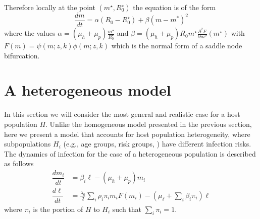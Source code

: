 \documentclass[12pt,a4paper]{article}
\theoremstyle{plain}%
\theoremstyle{definition}
\theoremstyle{remark}
\begin{document}
Therefore locally at the point $(m^{\star},R_0^{\star})$ the equation is of the form
\begin{equation}
\dfrac{dm}{dt}=\alpha (R_0-R_0^{\star})+\beta (m-m^*)^2
\end{equation}
where the values $\alpha=(\mu_h +\mu_p)\frac{m^{\star}}{R_0^{\star}}$ and $\beta=(\mu_h + \mu_p) R_0 m^{\star} \frac{\partial^2 F}{\partial m^2}(m^{\star})$ with $F(m)= \psi(m;z,k)\phi(m;z, k)$
which is the normal form of a saddle node bifurcation.



\section{A heterogeneous model}
In this section we will consider the most general and realistic case for a host population $H$. Unlike the homogeneous model presented in the previous section, here we present a model that accounts for host population heterogeneity, where subpopulations $H_i$ (e.g., age groups, risk groups, \cite{anderson1992infectious,anderson2014coverage,truscott2014modeling}) have different infection risks. The dynamics of infection for the case of a heterogeneous population is described as follows
\begin{equation}\label{model2}
	\begin{split}
		\dfrac{dm_i}{dt}&=\beta_i \ell - (\mu_h+\mu_p) m_i\\
		\dfrac{d\ell}{dt}&= \frac{\lambda_0}{2}    \sum_i \rho_i \pi_i m_i F(m_i)   - (\mu_{\ell}+\sum_i \beta_i \pi_i ) \ell 
	\end{split}
\end{equation} 
where $\pi_{i}$ is the portion of $H$ to $H_i$ such that $\sum_i \pi_{i}=1$.
\end{document}
